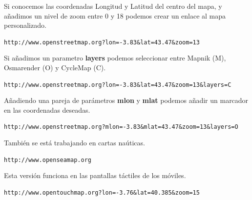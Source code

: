 \documentclass[11pt,a5]{article}
\newcommand{\web}[1]{\texttt{\color{VerdeOscuro2!50!black}\large #1}}
\newcommand{\alert}[1]{\textbf{\color{VerdeOscuro2!80!black}#1}}
\begin{document}
\begin{mdframed}[style=Caja, frametitle={\Large\color{green!10!white}Ver un mapa}]
 Si conocemos las coordenadas Longitud y Latitud del centro del mapa, y añadimos
un nivel de zoom entre 0 y 18 podemos crear un enlace al mapa personalizado.

\web{http://www.openstreetmap.org?lon=-3.83\&lat=43.47\&zoom=13}
\end{mdframed}

\begin{mdframed}[style=Caja, frametitle={\Large\color{green!10!white}Distintos Renders}]
 Si añadimos un parametro \alert{layers} podemos seleccionar entre Mapnik (M),
Osmarender (O) y CycleMap (C).

\web{http://www.openstreetmap.org?lon=-3.83\&lat=43.47\&zoom=13\&layers=C}
\end{mdframed}

\begin{mdframed}[style=Caja, frametitle={\Large\color{green!10!white}Marcadores}]
 Añadiendo una pareja de parámetros \alert{mlon} y \alert{mlat} podemos añadir un marcador
en las coordenadas deseadas.

\web{http://www.openstreetmap.org?mlon=-3.83\&mlat=43.47\&zoom=13\&layers=O}
\end{mdframed}

\begin{mdframed}[style=Caja, frametitle={\Large\color{green!10!white}OpenSeaMap}]
 También se está trabajando en cartas naúticas.

\web{http://www.openseamap.org}
\end{mdframed}

\begin{mdframed}[style=Caja, frametitle={\Large\color{green!10!white}OpenTouchMap}]
 Esta versión funciona en las pantallas táctiles de los móviles.

\web{http://www.opentouchmap.org?lon=-3.76\&lat=40.385\&zoom=15}
\end{mdframed}
\end{document}
